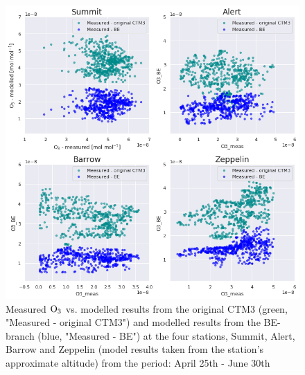 \begin{figure}[ht]
    \centering
    \includegraphics[width = \linewidth]{Chapter6_Results/images/scatter_april_june.png}
    \caption{Measured $\mathrm{O_3}$ vs. modelled results from the original CTM3 (green, "Measured - original CTM3") and modelled results from the BE-branch (blue, "Measured - BE") at the four stations, Summit, Alert, Barrow and Zeppelin (model results taken from the station's approximate altitude) from the period: April 25th - June 30th}
    \label{fig:scatter_AprMay}
\end{figure}